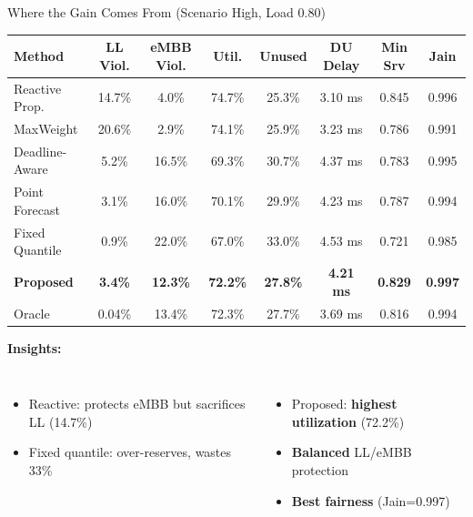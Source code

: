 \documentclass[aspectratio=169]{beamer}
\begin{document}
\begin{frame}{Where the Gain Comes From (Scenario High, Load 0.80)}
\begin{table}
\tiny
\begin{tabular}{lccccccc}
\toprule
\textbf{Method} & \textbf{LL Viol.} & \textbf{eMBB Viol.} & \textbf{Util.} & \textbf{Unused} & \textbf{DU Delay} & \textbf{Min Srv} & \textbf{Jain} \\
\midrule
Reactive Prop. & 14.7\% & 4.0\% & 74.7\% & 25.3\% & 3.10 ms & 0.845 & 0.996 \\
MaxWeight & 20.6\% & 2.9\% & 74.1\% & 25.9\% & 3.23 ms & 0.786 & 0.991 \\
Deadline-Aware & 5.2\% & 16.5\% & 69.3\% & 30.7\% & 4.37 ms & 0.783 & 0.995 \\
Point Forecast & 3.1\% & 16.0\% & 70.1\% & 29.9\% & 4.23 ms & 0.787 & 0.994 \\
Fixed Quantile & 0.9\% & 22.0\% & 67.0\% & 33.0\% & 4.53 ms & 0.721 & 0.985 \\
\rowcolor{green!20}
\textbf{Proposed} & \textbf{3.4\%} & \textbf{12.3\%} & \textbf{72.2\%} & \textbf{27.8\%} & \textbf{4.21 ms} & \textbf{0.829} & \textbf{0.997} \\
Oracle & 0.04\% & 13.4\% & 72.3\% & 27.7\% & 3.69 ms & 0.816 & 0.994 \\
\bottomrule
\end{tabular}
\end{table}

\vspace{0.3cm}
\textbf{Insights:}
\begin{columns}
\begin{itemize}
    \item Reactive: protects eMBB but sacrifices LL (14.7\%)
    \item Fixed quantile: over-reserves, wastes 33\%
\end{itemize}

\begin{itemize}
    \item Proposed: \textbf{highest utilization} (72.2\%)
    \item \textbf{Balanced} LL/eMBB protection
    \item \textbf{Best fairness} (Jain=0.997)
\end{itemize}
\end{columns}
\end{frame}
\end{document}
